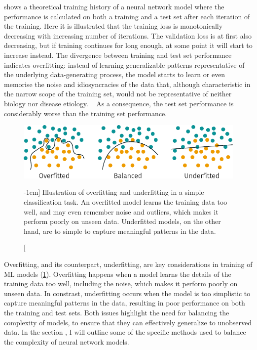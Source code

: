  shows a theoretical training history 
of a neural network model where the performance is calculated 
on both a training and a test set after each iteration of the training.
Here it is illustrated that 
the training loss is monotonically decreasing 
with increasing number of iterations.
The validation loss is at first also decreasing,
but if training continues for long enough,
at some point it will start to increase instead.
The divergence between training and test set performance 
indicates overfitting:
instead of learning generalizable patterns representative of the underlying 
data-generating process,
the model starts to learn or even memorise
the noise and idiosyncracies of the data that,
although characteristic in the narrow scope of the training set,
would not be representative of neither biology nor disease etiology.
~\autocite{murphyMachine2012}
As a consequence, the test set performance is considerably worse 
than the training set performance.

\begin{figure}[htb]
	\includegraphics{graphics/overfitting}
    \caption[What is Overfitting?][-1em]{%
        Illustration of overfitting and underfitting 
        in a simple classification task.
        An overfitted model learns the training data too well,
        and may even remember noise and outliers,
        which makes it perform poorly on unseen data.
        Underfitted models, on the other hand,
        are to simple to capture meaningful patterns in the data.
    }
    \label{fig:overfitting}
    \vspace{-2em}
\end{figure}

Overfitting, and its counterpart, underfitting,
are key considerations in training of \ac{ML} models (\cref{fig:overfitting}).
Overfitting happens 
when a model learns the details of the training data too well, 
including the noise, 
which makes it perform poorly on unseen data.
In constrast,
underfitting occurs when the model is too simplistic 
to capture meaningful patterns in the data, 
resulting in poor performance on both the training and test sets.
Both issues highlight the need for balancing the complexity of models,
to ensure that they can effectively generalize to unobserved data.
In the section ,
I will outline some of the specific methods 
used to balance the complexity 
of neural network models.

